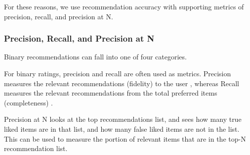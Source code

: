 For these reasons, we use recommendation accuracy with supporting metrics of precision, recall, and precision at N. 

\subsubsection{Precision, Recall, and Precision at N} \label{precision}

Binary recommendations can fall into one of four categories. 

For binary ratings, precision and recall are often used as metrics. Precision measures the relevant recommendations (fidelity) to the user , whereas Recall measures the relevant recommendations from the total preferred items (completeness) . 

Precision at N looks at the top recommendations list, and sees how many true liked items are in that list, and how many false liked items are not in the list. This can be used to measure the portion of relevant items that are in the top-N recommendation list.



